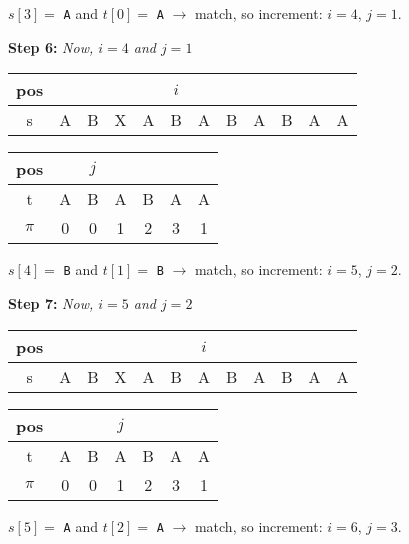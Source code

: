 $s[3] = $ \texttt{A} and $t[0] = $ \texttt{A} $\longrightarrow$ match, so increment: $i = 4$, $j = 1$.

\textbf{Step 6: }\textit{Now, $i = 4$ and $j = 1$}

\begin{table}[H]
\centering
\begin{tabular}{|c|c|c|c|c|c|c|c|c|c|c|c|}
\hline
pos   &   &   &   &   &$i$&   &   &   &   &   &   \\ \hline
s     & A & B & X & A & B & A & B & A & B & A & A \\ \hline
\end{tabular}
\end{table}

\begin{table}[H]
\centering
\begin{tabular}{|c|c|c|c|c|c|c|}
\hline
pos   &   & $j$ &   &   &   &   \\ \hline
t     & A & B & A & B & A & A \\ \hline
$\pi$ & 0 & 0 & 1 & 2 & 3 & 1 \\ \hline
\end{tabular}
\end{table}

$s[4] = $ \texttt{B} and $t[1] = $ \texttt{B} $\longrightarrow$ match, so increment: $i = 5$, $j = 2$.

\textbf{Step 7: }\textit{Now, $i = 5$ and $j = 2$}

\begin{table}[H]
\centering
\begin{tabular}{|c|c|c|c|c|c|c|c|c|c|c|c|}
\hline
pos   &   &   &   &   &   &$i$&   &   &   &   &   \\ \hline
s     & A & B & X & A & B & A & B & A & B & A & A \\ \hline
\end{tabular}
\end{table}

\begin{table}[H]
\centering
\begin{tabular}{|c|c|c|c|c|c|c|}
\hline
pos   &   &   &$j$&   &   &   \\ \hline
t     & A & B & A & B & A & A \\ \hline
$\pi$ & 0 & 0 & 1 & 2 & 3 & 1 \\ \hline
\end{tabular}
\end{table}

$s[5] = $ \texttt{A} and $t[2] = $ \texttt{A} $\longrightarrow$ match, so increment: $i = 6$, $j = 3$.

